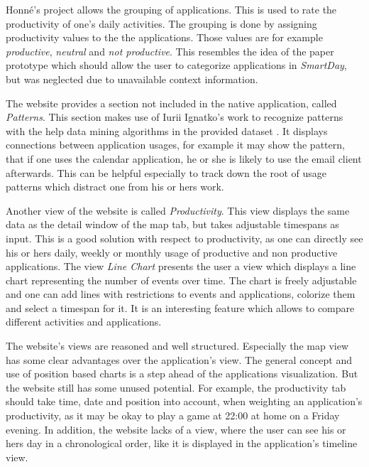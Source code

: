 Honné's  project allows the grouping of applications. This is used to rate the productivity of one's daily activities. The grouping is done by assigning productivity values to the the applications. Those values are for example \emph{productive}, \emph{neutral} and \emph{not productive}. This resembles the idea of the paper prototype which should allow the user to categorize applications in \emph{SmartDay}, but was neglected due to unavailable context information.

The  website provides a section not included in the native application, called \emph{Patterns}. This section makes use of Iurii Ignatko's work to recognize patterns with the help data mining algorithms in the provided dataset \cite{iuriisthesis}. It displays connections between application usages, for example it may show the pattern, that if one uses the calendar application, he or she is likely to use the email client afterwards. This can be helpful especially to track down the root of usage patterns which distract one from his or hers work.

Another  view of the website is called \emph{Productivity}. This view displays the same data as the detail window of the map tab, but takes adjustable timespans as input. This is a good solution with respect to productivity, as one can directly see his or hers daily, weekly or monthly usage of productive and non productive applications. The view \emph{Line Chart} presents the user a view which displays a line chart representing the number of events over time. The chart is freely adjustable and one can add lines with restrictions to events and applications, colorize them and select a timespan for it. It is an interesting feature which allows to compare different activities and applications. 

The website's views are reasoned and well structured. Especially the map view has some clear advantages over the application's view. The general concept and use of position based charts is a step ahead of the applications visualization. But the website still has some unused potential. For example, the productivity tab should take time, date and position into account, when weighting an application's productivity, as it may be okay to play a game at 22:00 at home on a Friday evening. In addition, the website lacks of a view, where the user can see his or hers day in a chronological order, like it is displayed in the application's timeline view.
